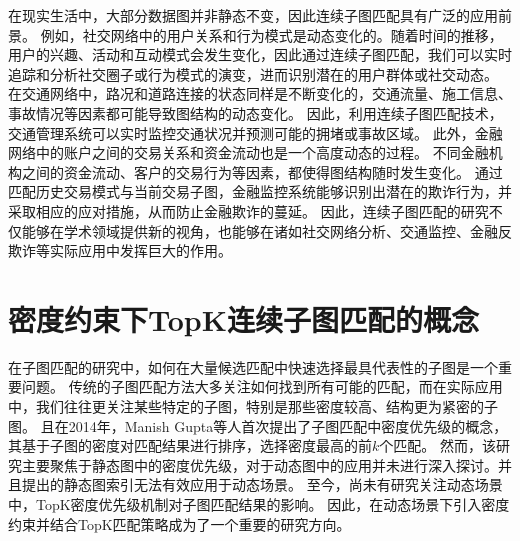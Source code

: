 在现实生活中，大部分数据图并非静态不变，因此连续子图匹配具有广泛的应用前景。
例如，社交网络中的用户关系和行为模式是动态变化的。随着时间的推移，用户的兴趣、活动和互动模式会发生变化，因此通过连续子图匹配，我们可以实时追踪和分析社交圈子或行为模式的演变，进而识别潜在的用户群体或社交动态。
在交通网络中，路况和道路连接的状态同样是不断变化的，交通流量、施工信息、事故情况等因素都可能导致图结构的动态变化。
因此，利用连续子图匹配技术，交通管理系统可以实时监控交通状况并预测可能的拥堵或事故区域。
此外，金融网络中的账户之间的交易关系和资金流动也是一个高度动态的过程。
不同金融机构之间的资金流动、客户的交易行为等因素，都使得图结构随时发生变化。
通过匹配历史交易模式与当前交易子图，金融监控系统能够识别出潜在的欺诈行为，并采取相应的应对措施，从而防止金融欺诈的蔓延。
因此，连续子图匹配的研究不仅能够在学术领域提供新的视角，也能够在诸如社交网络分析、交通监控、金融反欺诈等实际应用中发挥巨大的作用。

\section{密度约束下TopK连续子图匹配的概念}
在子图匹配的研究中，如何在大量候选匹配中快速选择最具代表性的子图是一个重要问题。
传统的子图匹配方法大多关注如何找到所有可能的匹配，而在实际应用中，我们往往更关注某些特定的子图，特别是那些密度较高、结构更为紧密的子图。
且在2014年，Manish Gupta等人首次提出了子图匹配中密度优先级的概念\cite{static-topk-Gupta-DBLP:conf/icde/GuptaGYCH14}，其基于子图的密度对匹配结果进行排序，选择密度最高的前$k$个匹配。
然而，该研究主要聚焦于静态图中的密度优先级，对于动态图中的应用并未进行深入探讨。并且提出的静态图索引无法有效应用于动态场景。
至今，尚未有研究关注动态场景中，TopK密度优先级机制对子图匹配结果的影响。
因此，在动态场景下引入密度约束并结合TopK匹配策略成为了一个重要的研究方向。

